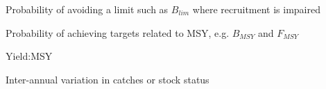 \begin{description}[labelindent=\parindent,noitemsep,topsep=0pt,parsep=0pt,partopsep=0pt]
 \item[Safety] Probability of avoiding a limit such as  $B_{lim}$ where recruitment is impaired
 \item[Status] Probability of achieving targets related to MSY, e.g.  $B_{MSY}$ and $F_{MSY}$
 \item[Yield] Yield:MSY
 \item[Variability] Inter-annual variation in catches or stock status
\end{description}







